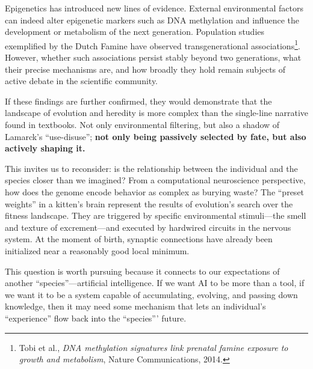 Epigenetics has introduced new lines of evidence. External environmental factors can indeed alter epigenetic markers such as DNA methylation and influence the development or metabolism of the next generation. Population studies exemplified by the Dutch Famine have observed transgenerational associations\footnote{Tobi et al., \textit{DNA methylation signatures link prenatal famine exposure to growth and metabolism}, Nature Communications, 2014.}. However, whether such associations persist stably beyond two generations, what their precise mechanisms are, and how broadly they hold remain subjects of active debate in the scientific community.

\vspace{1em}

If these findings are further confirmed, they would demonstrate that the landscape of evolution and heredity is more complex than the single-line narrative found in textbooks.
Not only environmental filtering, but also a shadow of Lamarck's ``use-disuse''; \textbf{not only being passively selected by fate, but also actively shaping it.}

\vspace{1em}

This invites us to reconsider: is the relationship between the individual and the species closer than we imagined? From a computational neuroscience perspective, how does the genome encode behavior as complex as burying waste? The ``preset weights'' in a kitten's brain represent the results of evolution's search over the fitness landscape. They are triggered by specific environmental stimuli---the smell and texture of excrement---and executed by hardwired circuits in the nervous system. At the moment of birth, synaptic connections have already been initialized near a reasonably good local minimum.


\vspace{0.8em}

This question is worth pursuing because it connects to our expectations of another ``species''---artificial intelligence. If we want AI to be more than a tool, if we want it to be a system capable of accumulating, evolving, and passing down knowledge, then it may need some mechanism that lets an individual's ``experience'' flow back into the ``species''' future.


